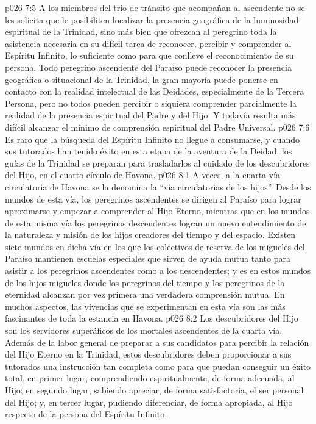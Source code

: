 \vs p026 7:5 \pc A los miembros del trío de tránsito que acompañan al ascendente no se les solicita que le posibiliten localizar la presencia geográfica de la luminosidad espiritual de la Trinidad, sino más bien que ofrezcan al peregrino toda la asistencia necesaria en su difícil tarea de reconocer, percibir y comprender al Espíritu Infinito, lo suficiente como para que conlleve el reconocimiento de su persona. Todo peregrino ascendente del Paraíso puede reconocer la presencia geográfica o situacional de la Trinidad, la gran mayoría puede ponerse en contacto con la realidad intelectual de las Deidades, especialmente de la Tercera Persona, pero no todos pueden percibir o siquiera comprender parcialmente la realidad de la presencia espiritual del Padre y del Hijo. Y todavía resulta más difícil alcanzar el mínimo de comprensión espiritual del Padre Universal.
\vs p026 7:6 Es raro que la búsqueda del Espíritu Infinito no llegue a consumarse, y cuando sus tutorados han tenido éxito en esta etapa de la aventura de la Deidad, los guías de la Trinidad se preparan para trasladarlos al cuidado de los descubridores del Hijo, en el cuarto círculo de Havona.
\vs p026 8:1 A veces, a la cuarta vía circulatoria de Havona se la denomina la “vía circulatorias de los hijos”. Desde los mundos de esta vía, los peregrinos ascendentes se dirigen al Paraíso para lograr aproximarse y empezar a comprender al Hijo Eterno, mientras que en los mundos de esta misma vía los peregrinos descendentes logran un nuevo entendimiento de la naturaleza y misión de los hijos creadores del tiempo y del espacio. Existen siete mundos en dicha vía en los que los colectivos de reserva de los migueles del Paraíso mantienen escuelas especiales que sirven de ayuda mutua tanto para asistir a los peregrinos ascendentes como a los descendentes; y es en estos mundos de los hijos migueles donde los peregrinos del tiempo y los peregrinos de la eternidad alcanzan por vez primera una verdadera comprensión mutua. En muchos aspectos, las vivencias que se experimentan en esta vía son las más fascinantes de toda la estancia en Havona.
\vs p026 8:2 Los descubridores del Hijo son los servidores superáficos de los mortales ascendentes de la cuarta vía. Además de la labor general de preparar a sus candidatos para percibir la relación del Hijo Eterno en la Trinidad, estos descubridores deben proporcionar a sus tutorados una instrucción tan completa como para que puedan conseguir un éxito total, en primer lugar, comprendiendo espiritualmente, de forma adecuada, al Hijo; en segundo lugar, sabiendo apreciar, de forma satisfactoria, el ser personal del Hijo; y, en tercer lugar, pudiendo diferenciar, de forma apropiada, al Hijo respecto de la persona del Espíritu Infinito.
